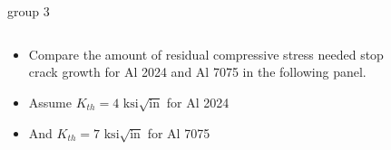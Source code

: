 \documentclass[10pt]{beamer}
\begin{document}
	\begin{frame}{group 3}
		\begin{columns}
			\begin{column}{0.48\linewidth}
				\begin{itemize}
					\item Compare the amount of residual compressive stress needed stop crack growth for Al 2024 and Al 7075 in the following panel.
					\item Assume $K_{th} = 4 \text{ ksi}\sqrt{\text{in}}$ for Al 2024
					\item And $K_{th} = 7 \text{ ksi}\sqrt{\text{in}}$ for Al 7075
				\end{itemize}
			\end{column}
			
			\begin{column}{0.48\linewidth}
				\begin{figure}[H]
					\centering
				\end{figure}
			\end{column}
		\end{columns}
		
	\end{frame}
	
\end{document}
